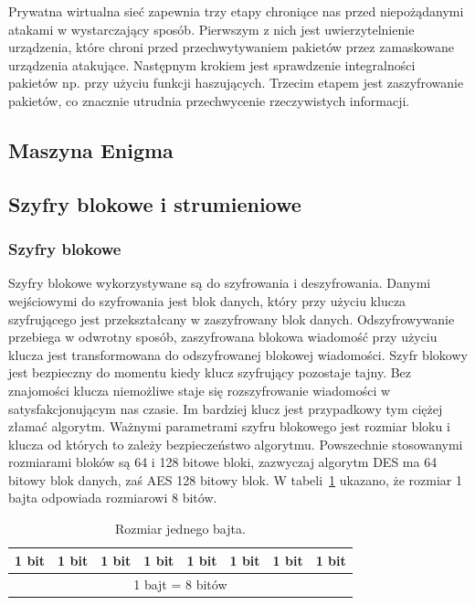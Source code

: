 \documentclass[12p]{article}
\begin{document}
\begin{itemize}
\quad Prywatna wirtualna sieć zapewnia trzy etapy chroniące nas przed niepożądanymi atakami w wystarczający sposób. Pierwszym z nich jest uwierzytelnienie urządzenia, które chroni przed przechwytywaniem pakietów przez zamaskowane urządzenia atakujące. Następnym krokiem jest sprawdzenie integralności pakietów np. przy użyciu funkcji haszujących. Trzecim etapem jest zaszyfrowanie pakietów, co znacznie utrudnia przechwycenie rzeczywistych informacji.
\end{itemize}


\subsection{Maszyna Enigma}

\subsection{Szyfry blokowe i strumieniowe}
\subsubsection{Szyfry blokowe} 
\quad Szyfry blokowe wykorzystywane są do szyfrowania i deszyfrowania. Danymi wejściowymi do szyfrowania jest blok danych, który przy użyciu klucza szyfrującego jest przekształcany w zaszyfrowany blok danych. Odszyfrowywanie przebiega w odwrotny sposób, zaszyfrowana blokowa wiadomość przy użyciu klucza jest transformowana do odszyfrowanej blokowej wiadomości. Szyfr blokowy jest bezpieczny do momentu kiedy klucz szyfrujący pozostaje tajny. Bez znajomości klucza niemożliwe staje się rozszyfrowanie wiadomości w satysfakcjonującym nas czasie. Im bardziej klucz jest przypadkowy tym ciężej złamać algorytm. Ważnymi parametrami szyfru blokowego jest rozmiar bloku i klucza od których to zależy bezpieczeństwo algorytmu. Powszechnie stosowanymi rozmiarami bloków są 64 i 128 bitowe bloki, zazwyczaj algorytm DES ma 64 bitowy blok danych, zaś AES 128 bitowy blok. W tabeli~\ref{bajt} ukazano, że rozmiar 1 bajta odpowiada rozmiarowi 8 bitów.
\begin{table}[H]
\centering
\begin{tabular}{|r|r|r|c|c|l|l|l|}
\hline
1 bit & 1 bit & 1 bit & 1 bit & 1 bit & 1 bit & 1 bit & 1 bit\\
\hline
\multicolumn{8}{|c|}{1 bajt = 8 bitów}\\
\hline
\end{tabular}
\caption{Rozmiar jednego bajta.}\label{bajt}
\end{table}
\end{document}
